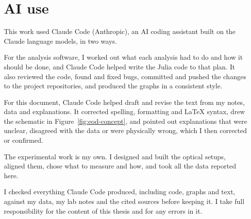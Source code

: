\documentclass{article}
\begin{document}
\section*{AI use}

This work used Claude Code (Anthropic), an AI coding assistant built on the Claude language
models, in two ways.

For the analysis software, I worked out what each analysis had to do and how it should be done,
and Claude Code helped write the Julia code to that plan. It also reviewed the code, found and
fixed bugs, committed and pushed the changes to the project repositories, and produced the graphs
in a consistent style.

For this document, Claude Code helped draft and revise the text from my notes, data and
explanations. It corrected spelling, formatting and LaTeX syntax, drew the schematic in
Figure~\ref{fig:eod-concept}, and pointed out explanations that were unclear, disagreed with the
data or were physically wrong, which I then corrected or confirmed.

The experimental work is my own. I designed and built the optical setups, aligned them, chose what
to measure and how, and took all the data reported here.

I checked everything Claude Code produced, including code, graphs and text, against my data, my lab
notes and the cited sources before keeping it. I take full responsibility for the content of this
thesis and for any errors in it.
\end{document}
